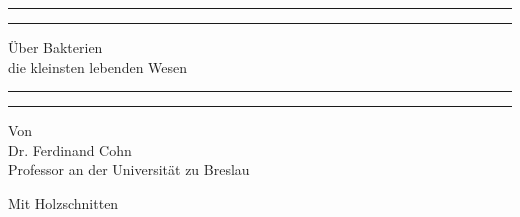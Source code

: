 \documentclass[a4paper, 11pt, oneside, english]{article}
\begin{document}
\renewcommand{\thefigure}{\swabfamily{\arabic{figure}}}
\renewcommand\thefootnote{\swabfamily{\arabic{footnote}}}
\let\oldfootnote\footnote
    \renewcommand{\footnote}[1]{\oldfootnote{\swabfamily\large#1}}
\begin{titlepage} %
	\centering %
	\scshape %

	
	\rule{\textwidth}{1.6pt}\vspace*{-\baselineskip}\vspace*{2pt} %
	\rule{\textwidth}{0.4pt} %
	
	\vspace{0.75\baselineskip} %

        {\Huge Über Bakterien \\\LARGE die kleinsten lebenden Wesen} %
	
	\vspace{0.75\baselineskip} %
	
	\rule{\textwidth}{0.4pt}\vspace*{-\baselineskip}\vspace{3.2pt} %
	\rule{\textwidth}{1.6pt} %
	
	\vspace{1\baselineskip} %
	
	
	{Von \\\LARGE Dr. Ferdinand Cohn\\\Large Professor an der Universität zu Breslau} %
	
	\vspace*{1\baselineskip} %

        {\large Mit Holzschnitten}

         \vspace*{1\baselineskip} %

	

\end{titlepage}
\end{document}

